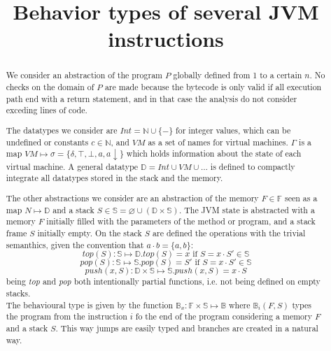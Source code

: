 \documentclass{amsart}
\newcommand{\N}{\mathbb{N}}
\newcommand{\bB}{\mathbb{B}}
\newcommand{\bF}{\mathbb{F}}
\newcommand{\bS}{\mathbb{S}}
\newcommand{\data}{\mathbb{D}}
\newcommand{\down}[1]{#1\downarrow}
\renewcommand{\emptyset}{\varnothing}
\numberwithin{equation}{section}
\theoremstyle{plain} %
\theoremstyle{definition}
\theoremstyle{remark}
\begin{document}
\title{Behavior types of several JVM instructions}





\begin{abstract}
We consider an abstraction of the program $P$ globally defined from 1 to a certain $n$. No checks on the domain of $P$ are made because the bytecode is only valid if all execution path end with a return statement, and in that case the analysis do not consider exceding lines of code.

The datatypes we consider are $Int = \N{} \cup \{-\}$ for integer values, which can be undefined or constants $c \in \N{}$, and $VM$ as a set of names for virtual machines. $\Gamma$ is a map $VM \mapsto \sigma = \{\delta, \top, \bot, a, \down{a}\}$ which holds information about the state of each virtual machine. A general datatype $\data{} = Int \cup VM \cup \dots$ is defined to compactly integrate all datatypes stored in the stack and the memory.

The other abstractions we consider are an abstraction of the memory $F \in \bF{}$ seen as a map $N \mapsto \data{}$ and a stack $S \in \bS{} = \emptyset \cup (\data{} \times \bS{})$. 
The JVM state is abstracted with a memory $F$ initially filled with the parameters of the method or program, and a stack frame $S$ initially empty. On the stack $S$ are defined the operations with the trivial semanthics, given the convention that $a\cdot b = \{a, b\} $:
\[
top(S): \bS{} \mapsto \data{}.top(S) = x \text{ if } S = x \cdot S' \in \bS{}
\]\[pop(S): \bS{} \mapsto \bS{}.pop(S) = S' \text{ if } S = x \cdot S' \in \bS{}
\]\[push(x, S): \data{} \times \bS{} \mapsto \bS{}.push(x, S) = x \cdot S
\]
being \emph{top} and \emph{pop} both intentionally partial functions, i.e. not being defined on empty stacks.\\

The behavioural type is given by the function $\bB{}_x:\bF{} \times \bS{} \mapsto \mathbb{B}$ where $\bB{}_i(F, S)$ types the program from the instruction $i$ fo the end of the program considering a memory $F$ and a stack $S$. This way jumps are easily typed and branches are created in a natural way.


\end{abstract}
\end{document}
